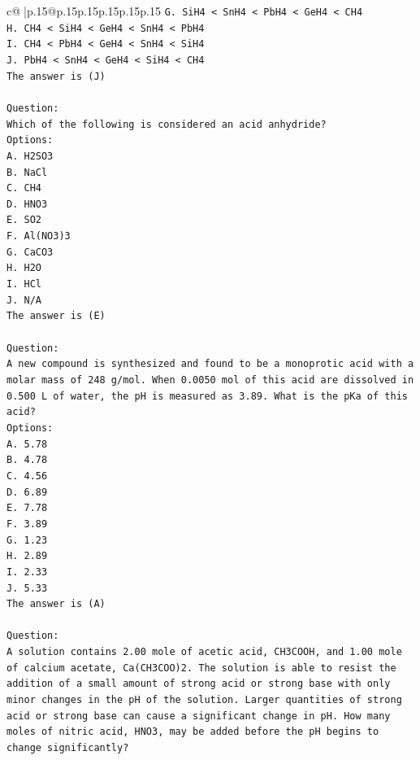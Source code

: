 \documentclass{article}
\begin{document}
{\begin{supertabular}{c@{$\;$}|p{.15\linewidth}@{}p{.15\linewidth}p{.15\linewidth}p{.15\linewidth}p{.15\linewidth}p{.15\linewidth}}
{{{\texttt{G. SiH4 < SnH4 < PbH4 < GeH4 < CH4} \\
\texttt{H. CH4 < SiH4 < GeH4 < SnH4 < PbH4} \\
\texttt{I. CH4 < PbH4 < GeH4 < SnH4 < SiH4} \\
\texttt{J. PbH4 < SnH4 < GeH4 < SiH4 < CH4} \\
\texttt{The answer is (J)} \\
\\ 
\texttt{Question:} \\
\texttt{Which of the following is considered an acid anhydride?} \\
\texttt{Options:} \\
\texttt{A. H2SO3} \\
\texttt{B. NaCl} \\
\texttt{C. CH4} \\
\texttt{D. HNO3} \\
\texttt{E. SO2} \\
\texttt{F. Al(NO3)3} \\
\texttt{G. CaCO3} \\
\texttt{H. H2O} \\
\texttt{I. HCl} \\
\texttt{J. N/A} \\
\texttt{The answer is (E)} \\
\\ 
\texttt{Question:} \\
\texttt{A new compound is synthesized and found to be a monoprotic acid with a molar mass of 248 g/mol. When 0.0050 mol of this acid are dissolved in 0.500 L of water, the pH is measured as 3.89. What is the pKa of this acid?} \\
\texttt{Options:} \\
\texttt{A. 5.78} \\
\texttt{B. 4.78} \\
\texttt{C. 4.56} \\
\texttt{D. 6.89} \\
\texttt{E. 7.78} \\
\texttt{F. 3.89} \\
\texttt{G. 1.23} \\
\texttt{H. 2.89} \\
\texttt{I. 2.33} \\
\texttt{J. 5.33} \\
\texttt{The answer is (A)} \\
\\ 
\texttt{Question:} \\
\texttt{A solution contains 2.00 mole of acetic acid, CH3COOH, and 1.00 mole of calcium acetate, Ca(CH3COO)2. The solution is able to resist the addition of a small amount of strong acid or strong base with only minor changes in the pH of the solution. Larger quantities of strong acid or strong base can cause a significant change in pH. How many moles of nitric acid, HNO3, may be added before the pH begins to change significantly?} \\
}}}
\end{supertabular}}
\end{document}
